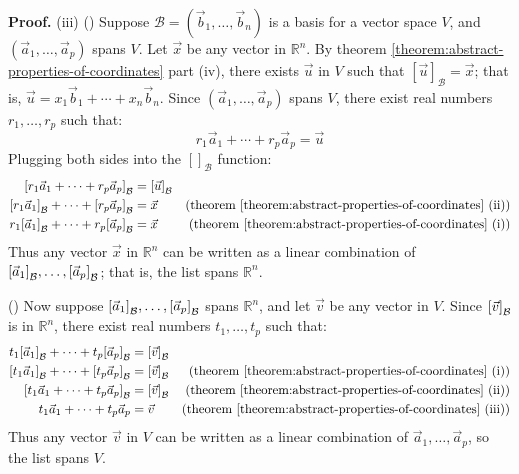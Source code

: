 \documentclass[11pt, letterpaper]{report}
\newenvironment{book}{}{}
\let\originalleft\left
\let\originalright\right
\renewcommand{\left}{\mathopen{}\mathclose\bgroup\originalleft}
\renewcommand{\right}{\aftergroup\egroup\originalright}
\newcounter{theorem}[chapter]
\newcommand{\R}{\mathbb{R}}
\begin{document}
\begin{book}
\textbf{Proof.} (iii) (\rightarrow) Suppose $\mathcal{B} = ( \vec{b}_1, \ldots, \vec{b}_n)$ is a basis for a vector space $V$, and $( \vec{a}_1 , \ldots, \vec{a}_p)$ spans $V$. Let $\vec{x}$ be any vector in $\R^n$. By theorem \ref{theorem:abstract-properties-of-coordinates} part (iv), there exists $\vec{u}$ in $V$ such that $[\vec{u}]_{\mathcal{B}} = \vec{x}$; that is, $\vec{u}=x_1\vec{b}_1+\cdots + x_n\vec{b}_n$. Since $( \vec{a}_1 , \ldots, \vec{a}_p)$ spans $V$, there exist real numbers $r_1,\ldots,r_p$ such that:
\[r_1\vec{a}_1+\cdots+r_p\vec{a}_p=\vec{u}\]
Plugging both sides into the $[]_{\mathcal{B}}$ function:
\begin{align*}
\left[r_1\vec{a}_1+\cdots+r_p\vec{a}_p\right]_{\mathcal{B}}&=\left[\vec{u}\right]_{\mathcal{B}} \\
\left[r_1\vec{a}_1\right]_{\mathcal{B}}+\cdots+\left[r_p\vec{a}_p\right]_{\mathcal{B}}&= \vec{x} & \text{(theorem \ref{theorem:abstract-properties-of-coordinates} (ii))} \\ 
r_1\left[\vec{a}_1\right]_{\mathcal{B}}+\cdots+r_p\left[\vec{a}_p\right]_{\mathcal{B}}&= \vec{x} & \text{(theorem \ref{theorem:abstract-properties-of-coordinates} (i))} 
\end{align*}
Thus any vector $\vec{x}$ in $\R^n$ can be written as a linear combination of $\left[ \vec{a}_1 \right]_{\mathcal{B}},\ldots,\left[ \vec{a}_p \right]_{\mathcal{B}}$; that is, the list spans $\R^n$.

(\leftarrow) Now suppose $\left[ \vec{a}_1 \right]_{\mathcal{B}},\ldots,\left[ \vec{a}_p \right]_{\mathcal{B}}$ spans $\R^n$, and let $\vec{v}$ be any vector in $V$. Since $\left[ \vec{v} \right]_{\mathcal{B}}$ is in $\R^n$, there exist real numbers $t_1,\ldots,t_p$ such that:
\begin{align*}
t_1 \left[ \vec{a}_1 \right]_{\mathcal{B}} + \cdots + t_p \left[ \vec{a}_p \right]_{\mathcal{B}} &= \left[ \vec{v} \right]_{\mathcal{B}} \\
 \left[t_1 \vec{a}_1 \right]_{\mathcal{B}} + \cdots +  \left[t_p \vec{a}_p \right]_{\mathcal{B}} &= \left[ \vec{v} \right]_{\mathcal{B}} &(\text{theorem \ref{theorem:abstract-properties-of-coordinates} (i)})\\
 \left[t_1 \vec{a}_1  + \cdots +  t_p \vec{a}_p \right]_{\mathcal{B}} &= \left[ \vec{v} \right]_{\mathcal{B}} &(\text{theorem \ref{theorem:abstract-properties-of-coordinates} (ii)})\\
t_1 \vec{a}_1  + \cdots +  t_p \vec{a}_p  &=  \vec{v}  &(\text{theorem \ref{theorem:abstract-properties-of-coordinates} (iii)})
\end{align*}
Thus any vector $\vec{v}$ in $V$ can be written as a linear combination of $\vec{a}_1,\ldots,\vec{a}_p$, so the list spans $V$. \blacksquare
\end{book}
\end{document}
